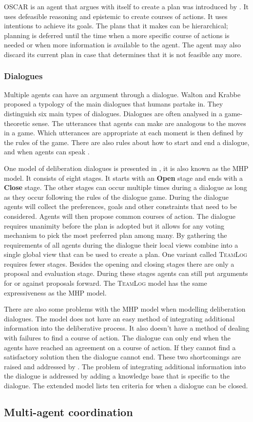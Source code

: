 OSCAR is an agent that argues with itself to create a plan was introduced by
\cite{pollock1995}. It uses defeasible reasoning and epistemic to create
courses of actions. It uses intentions to achieve its goals. The plans that it
makes can be hierarchical; planning is deferred until the time when a more
specific course of actions is needed or when more information is available to
the agent. The agent may also discard its current plan in case that determines
that it is not feasible any more.

\subsubsection{Dialogues}
Multiple agents can have an argument through a dialogue. Walton and
Krabbe \citep{walton1995} proposed a typology of the main dialogues that humans
partake in. They distinguish six main types of dialogues. Dialogues are often
analysed in a game-theoretic sense. The utterances that agents can make are
analogous to the moves in a game. Which utterances are appropriate at each
moment is then defined by the rules of the game. There are also rules about how
to start and end a dialogue, and when agents can speak
\citep{prakken2006,prakken2009,mcburney2009}.

One model of deliberation dialogues is presented in \citep{mcburney2007}, it is
also known as the MHP model. It
consists of eight stages. It starts with an \textbf{Open} stage and ends with
a \textbf{Close} stage. The other stages can occur multiple times during a
dialogue as long as they occur following the rules of the dialogue game.
During the dialogue agents will collect the preferences, goals and other
constraints that need to be considered. Agents will then propose common courses
of action. The dialogue requires unanimity before the plan is adopted but it
allows for any voting mechanism to pick the most preferred plan among many. By
gathering the requirements of all agents during the dialogue their local views
combine into a single global view that can be used to create a plan. One
variant called \textsc{TeamLog} \citep{dunin-keplicz2011} requires fewer
stages.
Besides the opening and closing stages there are only a proposal and evaluation
stage. During these stages agents can still put arguments for or against
proposals forward. The \textsc{TeamLog} model has the same expressiveness as
the MHP model.

There are also some problems with the MHP model when modelling
deliberation dialogues. The model does not have an easy method of integrating
additional information into the deliberative process. It also doesn't have a
method of dealing with failures to find a course of action. The dialogue can
only end when the agents have reached an agreement on a course of action. If
they cannot find a satisfactory solution then the dialogue cannot end. These
two shortcomings are raised and addressed by \citep{walton2014}. The problem of
integrating additional information into the dialogue is addressed by adding a
knowledge base that is specific to the dialogue. The extended model lists ten
criteria for when a dialogue can be closed.

\subsection{Multi-agent coordination}
